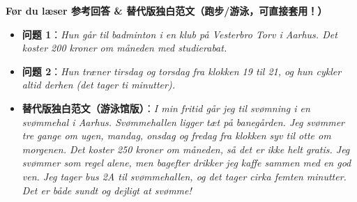 \begin{answerbox}
\textbf{Før du læser 参考回答 \& 替代版独白范文（跑步/游泳，可直接套用！）}
\begin{itemize}
  \item \textbf{问题 1}：\textit{Hun går til badminton i en klub på Vesterbro Torv i Aarhus. Det koster 200 kroner om måneden med studierabat.}
  \item \textbf{问题 2}：\textit{Hun træner tirsdag og torsdag fra klokken 19 til 21, og hun cykler altid derhen (det tager ti minutter).}
  \item \textbf{替代版独白范文（游泳馆版）}：\textit{I min fritid går jeg til svømning i en svømmehal i Aarhus. Svømmehallen ligger tæt på banegården. Jeg svømmer tre gange om ugen, mandag, onsdag og fredag fra klokken syv til otte om morgenen. Det koster 250 kroner om måneden, så det er ikke helt gratis. Jeg svømmer som regel alene, men bagefter drikker jeg kaffe sammen med en god ven. Jeg tager bus 2A til svømmehallen, og det tager cirka femten minutter. Det er både sundt og dejligt at svømme!}
\end{itemize}
\end{answerbox}
